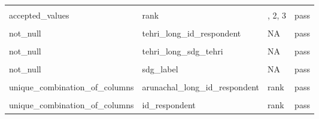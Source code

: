 \begin{table}[!h]
\begin{tabular}[t]{>{\raggedright\arraybackslash}p{}>{\raggedright\arraybackslash}p{}>{\raggedright\arraybackslash}p{}>{\raggedright\arraybackslash}p{}}
\hspace{1em}\cellcolor{gray!10}{accepted\_values} & \cellcolor{gray!10}{tehri\_long\_rank} & \cellcolor{gray!10}{1, 2, 3} & \cellcolor{gray!10}{pass}\\
\hspace{1em}accepted\_values & rank & 1, 2, 3 & pass\\
\hspace{1em}\cellcolor{gray!10}{not\_null} & \cellcolor{gray!10}{arunachal\_long\_id\_respondent} & \cellcolor{gray!10}{NA} & \cellcolor{gray!10}{pass}\\
\hspace{1em}not\_null & tehri\_long\_id\_respondent & NA & pass\\
\hspace{1em}\cellcolor{gray!10}{not\_null} & \cellcolor{gray!10}{tehri\_long\_rank} & \cellcolor{gray!10}{NA} & \cellcolor{gray!10}{pass}\\
\hspace{1em}not\_null & tehri\_long\_sdg\_tehri & NA & pass\\
\hspace{1em}\cellcolor{gray!10}{not\_null} & \cellcolor{gray!10}{id\_respondent} & \cellcolor{gray!10}{NA} & \cellcolor{gray!10}{pass}\\
\hspace{1em}not\_null & sdg\_label & NA & pass\\
\hspace{1em}\cellcolor{gray!10}{not\_null} & \cellcolor{gray!10}{sdg\_number} & \cellcolor{gray!10}{NA} & \cellcolor{gray!10}{pass}\\
\hspace{1em}unique\_combination\_of\_columns & arunachal\_long\_id\_respondent & rank & pass\\
\hspace{1em}\cellcolor{gray!10}{unique\_combination\_of\_columns} & \cellcolor{gray!10}{tehri\_long\_id\_respondent} & \cellcolor{gray!10}{rank} & \cellcolor{gray!10}{pass}\\
\hspace{1em}unique\_combination\_of\_columns & id\_respondent & rank & pass\\
\bottomrule
\end{tabular}
\end{table}
